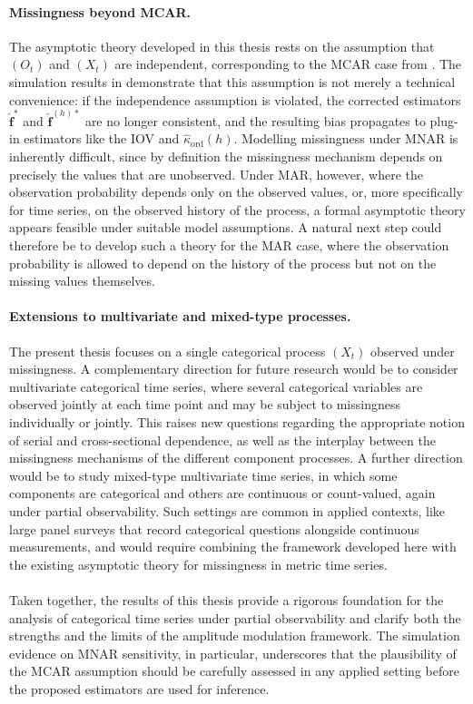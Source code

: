 ﻿\documentclass[12pt,a4paper]{scrreprt}
\theoremstyle{definition}
\begin{document}
\paragraph{Missingness beyond MCAR.} The asymptotic theory developed 
in this thesis rests on the assumption that $(O_t)$ and $(X_t)$ are 
independent, corresponding to the MCAR case from . The simulation results 
in  demonstrate that this assumption is not merely a 
technical convenience: if the independence assumption is violated, 
the corrected estimators $\hat{\boldsymbol{f}}^*$ and $\hat{\boldsymbol{f}}^{(h)*}$ 
are no longer consistent, and the resulting bias propagates to
plug-in estimators like the IOV and $\hat{\kappa}_{\mathrm{ord}}(h)$. 
Modelling missingness under MNAR is inherently difficult, since by 
definition the missingness mechanism depends on precisely the values 
that are unobserved. Under MAR, however, where the observation 
probability depends only on the observed values, or, more specifically for time series,
on the observed history of the process, a 
formal asymptotic theory appears feasible under suitable model 
assumptions. A natural next step could therefore be to develop such a 
theory for the MAR case, where the observation probability is allowed 
to depend on the history of the process but not on the missing values 
themselves.

\paragraph{Extensions to multivariate and mixed-type processes.} 
The present thesis focuses on a single categorical process $(X_t)$ 
observed under missingness. A complementary direction for future research 
would be to consider multivariate categorical time series, where several categorical 
variables are observed jointly at each time point and may be subject 
to missingness individually or jointly. This raises new questions 
regarding the appropriate notion of serial and cross-sectional 
dependence, as well as the interplay between the missingness 
mechanisms of the different component processes. A further direction 
would be to study mixed-type multivariate time series, in which some 
components are categorical and others are continuous or count-valued, 
again under partial observability. Such settings are common in 
applied contexts, like large panel surveys that record categorical questions
alongside continuous measurements, and would require 
combining the framework developed here with the existing asymptotic 
theory for missingness in metric time series.\\\\
Taken together, the results of this thesis provide a rigorous 
foundation for the analysis of categorical time series under 
partial observability and clarify both the strengths and the limits 
of the amplitude modulation framework. The simulation evidence on 
MNAR sensitivity, in particular, underscores that the plausibility of 
the MCAR assumption should be carefully assessed in any applied 
setting before the proposed estimators are used for inference.
\end{document}
